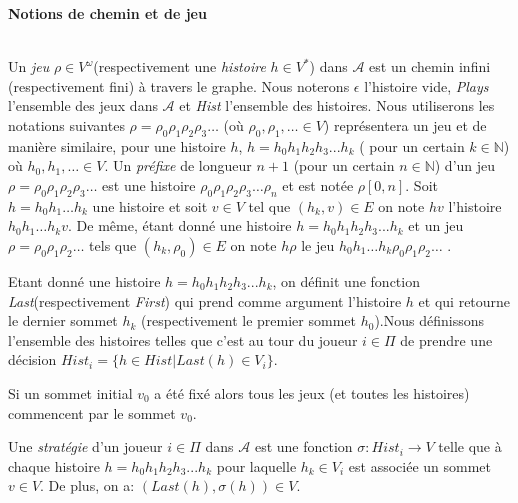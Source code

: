 \noindent\textbf{Notions de chemin et de jeu}

\\

Un \textit{jeu} $\rho \in V^{\omega}$(respectivement une \textit{histoire} $h \in V^{*}$) dans $\mathcal{A}$ est un chemin infini (respectivement fini) à travers le graphe. Nous noterons $\epsilon$ l'histoire vide, \textit{Plays} l'ensemble des jeux dans $\mathcal{A}$ et \textit{Hist} l'ensemble des histoires. Nous utiliserons les notations suivantes $\rho = \rho _{0}  \rho _{1} \rho _{2}\rho _{3} \ldots$ (où $\rho _{0},  \rho _{1},\ldots \in V$)  représentera un jeu et de manière similaire, pour une histoire $h$, $ h = h_{0} h_{1} h_{2} h_{3} ... h_{k}$ ( pour un certain $k \in \mathbb{N}$) où  $h_{0}, h_{1}, \ldots \in V$.
Un \textit{préfixe} de longueur $n+1$ (pour un certain $n\in \mathbb{N}$) d'un jeu $\rho = \rho _{0}  \rho _{1} \rho _{2}\rho _{3} \ldots$ est une histoire $\rho _{0}  \rho _{1} \rho _{2}\rho _{3} \ldots \rho _{n}$ et est notée $\rho[0,n]$. Soit $ h = h_{0} h_{1} \ldots h_{k}$ une histoire et soit $v \in V$ tel que $(h_{k},v)\in E$ on note $hv$ l'histoire $h_{0} h_{1} \ldots h_{k}v$. De même, étant donné une histoire $ h = h_{0} h_{1} h_{2} h_{3} ... h_{k}$ et un jeu $\rho = \rho _{0}  \rho _{1} \rho _{2} \ldots$ tels que $(h_{k},\rho_{0})\in E$ on note $h\rho$ le jeu $ h_{0} h_{1} \ldots h_{k}\rho _{0}  \rho _{1} \rho _{2} \ldots$ .

Etant donné une histoire $ h = h_{0} h_{1} h_{2} h_{3} ... h_{k}$,  on définit une fonction \textit{Last}(respectivement \textit{First}) qui prend comme argument l'histoire $h$ et qui retourne le dernier sommet $h_{k}$ (respectivement le premier sommet $h_{0}$).Nous définissons l'ensemble des histoires telles que c'est au tour du joueur $i \in \Pi$ de prendre une décision $Hist_{i} = \{ h \in Hist | Last(h) \in V_{i} \}$.

\begin{rem}
	Si un sommet initial $v_{0}$ a été fixé alors tous les jeux (et toutes les histoires) commencent par le sommet $v_{0}.$\\
\end{rem}


\begin{defi}[Stratégie]
	Une \textit{stratégie} d'un joueur $i \in \Pi$ dans $\mathscr{A}$ est une fonction \mbox{$\sigma:Hist_{i} \rightarrow V$} telle que à chaque histoire $ h = h_{0} h_{1} h_{2} h_{3} ... h_{k}$ pour laquelle $h_{k} \in V_{i}$ est associée un sommet $v \in V$. De plus, on a: $(Last(h),\sigma(h))\in V$.
\end{defi}

